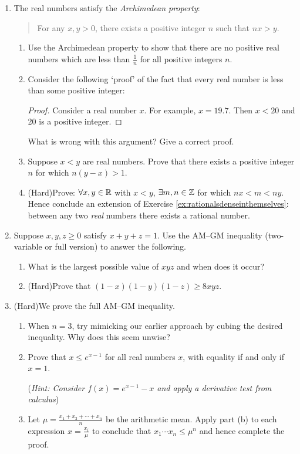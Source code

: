 \begin{exercises}{}{}
\begin{enumerate}
	
		\goodbreak
	
	
		\item\label{exs:archimedes} The real numbers satisfy the \emph{Archimedean property}:
		\begin{quote}
			For any $x,y>0$, there exists a positive integer $n$ such that $nx>y$.
		\end{quote}
		\begin{enumerate}
		  \item Use the Archimedean property to show that there are no positive real numbers which are less than $\frac 1n$ for all positive integers $n$. 
	  
	  	\item Consider the following `proof' of the fact that every real number is less than some positive integer:
	  	\begin{proof}
	    	Consider a real number $x$. For example, $x = 19.7$. Then $x<20$ and 20 is a positive integer. 
	 		\end{proof}
	  	What is wrong with this argument? Give a correct proof.
		
			\item Suppose $x<y$ are real numbers. Prove that there exists a positive integer $n$ for which $n(y-x)>1$.
			
			\item (Hard)\lstsp Prove: $\forall x,y\in\mathbb{R}$ with $x<y$, $\exists m,n\in\mathbb{Z}$ for which $nx<m<ny$. Hence conclude an extension of Exercise \ref{ex:rationalsdenseinthemselves}: between any two \emph{real} numbers there exists a rational number.
		\end{enumerate}
	
	
		\item Suppose $x,y,z\ge 0$ satisfy $x+y+z=1$. Use the AM--GM inequality (two-variable or full version) to answer the following.
		\begin{enumerate}
		  \item What is the largest possible value of $xyz$ and when does it occur?
		  \item (Hard)\lstsp Prove that $(1-x)(1-y)(1-z)\ge 8xyz$.
		\end{enumerate}
    
    
		\item\label{exs:amgm-full} (Hard)\lstsp We prove the full AM--GM inequality.
		\begin{enumerate}
		  \item When $n=3$, try mimicking our earlier approach by cubing the desired inequality. Why does this seem unwise?
		  \item Prove that $x\le e^{x-1}$ for all real numbers $x$, with equality if and only if $x=1$.\par
		  (\emph{Hint: Consider $f(x)=e^{x-1}-x$ and apply a derivative test from calculus})
		  \item Let $\mu=\frac{x_1+x_2+\cdots +x_n}{n}$ be the arithmetic mean. Apply part (b) to each expression $x=\frac{x_i}\mu$ to conclude that $x_1\cdots x_n\le \mu^n$ and hence complete the proof.
		\end{enumerate}


\end{enumerate}
\end{exercises}
